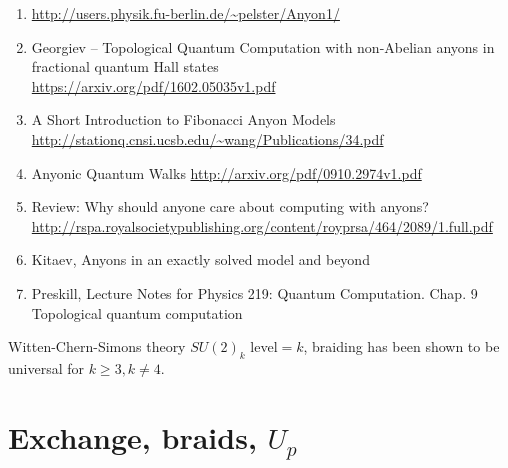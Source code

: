 \documentclass[a4paper,10pt,oneside]{book}
\theoremstyle{plain}
\theoremstyle{definition}
\theoremstyle{remark}
\begin{document}
{\begin{enumerate}
  \item \url{http://users.physik.fu-berlin.de/~pelster/Anyon1/}
  \item Georgiev -- Topological Quantum Computation with non-Abelian anyons in fractional quantum Hall states \\
    \url{https://arxiv.org/pdf/1602.05035v1.pdf}
  \item A Short Introduction to Fibonacci Anyon Models \url{http://stationq.cnsi.ucsb.edu/~wang/Publications/34.pdf}
  \item Anyonic Quantum Walks \url{http://arxiv.org/pdf/0910.2974v1.pdf}
  \item Review: Why should anyone care about computing with anyons? \url{http://rspa.royalsocietypublishing.org/content/royprsa/464/2089/1.full.pdf}
  \item Kitaev, Anyons in an exactly solved model and beyond
  \item Preskill, Lecture Notes for Physics 219: Quantum Computation. Chap. 9 Topological quantum computation
\end{enumerate}


Witten-Chern-Simons theory $SU(2)_k$ level$=k$, braiding has been shown to be universal for $k\ge 3, k \ne 4$. \cite{freedman kitaev larsen wang}





















































\chapter{Exchange, braids, $U_p$}\label{anyonic-phase}

}
\end{document}
